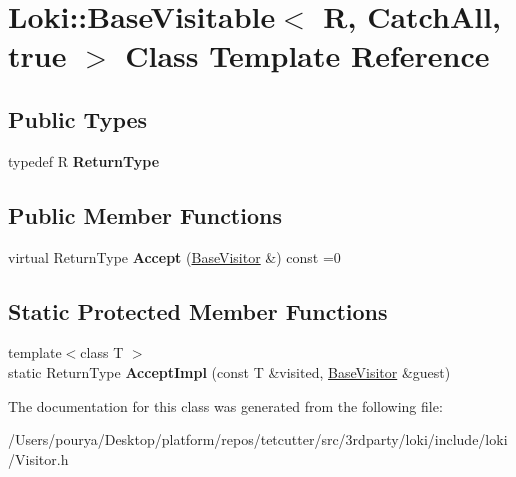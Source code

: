 \hypertarget{classLoki_1_1BaseVisitable_3_01R_00_01CatchAll_00_01true_01_4}{}\section{Loki\+:\+:Base\+Visitable$<$ R, Catch\+All, true $>$ Class Template Reference}
\label{classLoki_1_1BaseVisitable_3_01R_00_01CatchAll_00_01true_01_4}
\subsection*{Public Types}
\begin{DoxyCompactItemize}
\item 
\hypertarget{classLoki_1_1BaseVisitable_3_01R_00_01CatchAll_00_01true_01_4_a342bf0643455c4b00b48c5a3360085f4}{}typedef R {\bfseries Return\+Type}\label{classLoki_1_1BaseVisitable_3_01R_00_01CatchAll_00_01true_01_4_a342bf0643455c4b00b48c5a3360085f4}

\end{DoxyCompactItemize}
\subsection*{Public Member Functions}
\begin{DoxyCompactItemize}
\item 
\hypertarget{classLoki_1_1BaseVisitable_3_01R_00_01CatchAll_00_01true_01_4_ac29cd4a06a2d75c1db7be0cd4465721f}{}virtual Return\+Type {\bfseries Accept} (\hyperlink{classLoki_1_1BaseVisitor}{Base\+Visitor} \&) const  =0\label{classLoki_1_1BaseVisitable_3_01R_00_01CatchAll_00_01true_01_4_ac29cd4a06a2d75c1db7be0cd4465721f}

\end{DoxyCompactItemize}
\subsection*{Static Protected Member Functions}
\begin{DoxyCompactItemize}
\item 
\hypertarget{classLoki_1_1BaseVisitable_3_01R_00_01CatchAll_00_01true_01_4_a4771f99d8c1ca78da17818781ac96342}{}{\footnotesize template$<$class T $>$ }\\static Return\+Type {\bfseries Accept\+Impl} (const T \&visited, \hyperlink{classLoki_1_1BaseVisitor}{Base\+Visitor} \&guest)\label{classLoki_1_1BaseVisitable_3_01R_00_01CatchAll_00_01true_01_4_a4771f99d8c1ca78da17818781ac96342}

\end{DoxyCompactItemize}


The documentation for this class was generated from the following file\+:\begin{DoxyCompactItemize}
\item 
/\+Users/pourya/\+Desktop/platform/repos/tetcutter/src/3rdparty/loki/include/loki/Visitor.\+h\end{DoxyCompactItemize}
